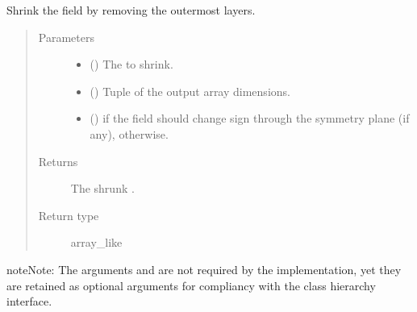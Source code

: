 \documentclass[letterpaper,10pt,english]{sphinxmanual}
\begin{document}
\begin{fulllineitems}

\begin{fulllineitems}
\label{\detokenize{api:tasmania.dycore.horizontal_boundary_periodic.Periodic.from_computational_to_physical_domain}}
Shrink the field  by removing the  outermost layers.
\begin{quote}\begin{description}
\item[{Parameters}] \leavevmode\begin{itemize}
\item {} 
 () \textendash{} The  to shrink.

\item {} 
 () \textendash{} Tuple of the output array dimensions.

\item {} 
 () \textendash{}  if the field should change sign through the symmetry plane (if any),  otherwise.

\end{itemize}

\item[{Returns}] \leavevmode
The shrunk .

\item[{Return type}] \leavevmode
array\_like

\end{description}\end{quote}

\begin{sphinxadmonition}{note}{Note:}
The arguments  and  are not required by the implementation,
yet they are retained as optional arguments for compliancy with the class hierarchy interface.
\end{sphinxadmonition}


\end{fulllineitems}
\end{fulllineitems}
\end{document}
